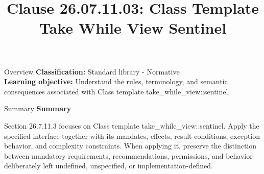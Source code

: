 \documentclass[10pt,letterpaper]{article}
\title{Clause 26.07.11.03: Class Template Take While View Sentinel}
\author{}
\date{}
\begin{document}
\maketitle
\begin{CornellOverviewBox}{Overview}
\textbf{Classification:} Standard library - Normative\\[2pt]
\textbf{Learning objective:} Understand the rules, terminology, and semantic consequences associated with Class template take\_while\_view::sentinel.
\end{CornellOverviewBox}\begin{CornellSummaryBox}{Summary}
{\sffamily\bfseries\color{Accent} Summary}\par\vspace{3pt}Section 26.7.11.3 focuses on Class template take\_while\_view::sentinel. Apply the specified interface together with its mandates, effects, result conditions, exception behavior, and complexity constraints. When applying it, preserve the distinction between mandatory requirements, recommendations, permissions, and behavior deliberately left undefined, unspecified, or implementation-defined.
\end{CornellSummaryBox}
\end{document}
